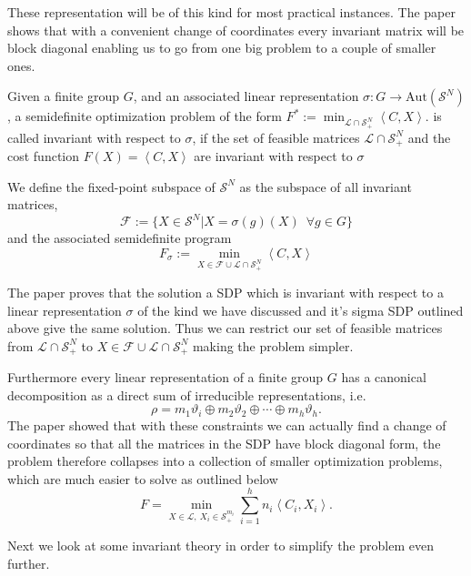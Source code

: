 \documentclass[]{article}
\begin{document}
These representation will be of this kind for most practical instances. The paper shows that with a convenient change of coordinates every 
invariant matrix will be block diagonal enabling us to go from one big problem to a couple of smaller ones. 
\begin{definition}
    Given a finite group $G$, and an associated linear representation $\sigma:G\rightarrow \mathrm{Aut}(\mathcal{S}^N)$, a semidefinite
    optimization problem of the form $F^\ast:=\min_{\mathcal{L}\cap \mathcal{S}_+^N}\left<C,X\right>.$ is called invariant with 
    respect to $\sigma$, if the set of feasible matrices $\mathcal{L}\cap \mathcal{S}_+^N$ and the cost function $F(X)=\left<C,X\right>$ are invariant with respect to $\sigma$
\end{definition}
\begin{definition}
    We define the fixed-point subspace of $\mathcal{S}^N$ as the subspace of all invariant matrices, 
    \[\mathcal{F} := \{X\in\mathcal{S}^N | X= \sigma(g)(X)\,\,\, \forall g \in G\}\] 
    and the associated semidefinite program 
    \[F_\sigma := \min_{X\in\mathcal{F}\cup\mathcal{L}\cap \mathcal{S}_+^N } \left<C,X\right>\]
\end{definition}

The paper proves that the solution a SDP which is invariant with respect to a linear representation $\sigma$ of the kind we have discussed and it's sigma SDP outlined above give the same solution. 
Thus we can restrict our set of feasible matrices from $\mathcal{L}\cap \mathcal{S}_+^N$ to $ X\in\mathcal{F}\cup\mathcal{L}\cap \mathcal{S}_+^N$ making the problem simpler.

Furthermore every linear representation of a finite group $G$ has a canonical decomposition as a direct sum of irreducible representations, i.e.
\[\rho = m_1\vartheta_i\oplus m_2\vartheta_2 \oplus \cdots \oplus m_h\vartheta_h.\]
The paper showed that with these constraints we can actually find a change of coordinates so that all the matrices 
in the SDP have block diagonal form, the problem therefore collapses into a collection of smaller 
optimization problems, which are much easier to solve as outlined below 
\[F = \min_{X\in\mathcal{L},~X_i \in \mathcal{S}_+^{m_i} }\sum_{i=1}^{h} n_i\left<C_i,X_i\right>.\]

Next we look at some invariant theory in order to simplify the problem even further. 
\end{document}
